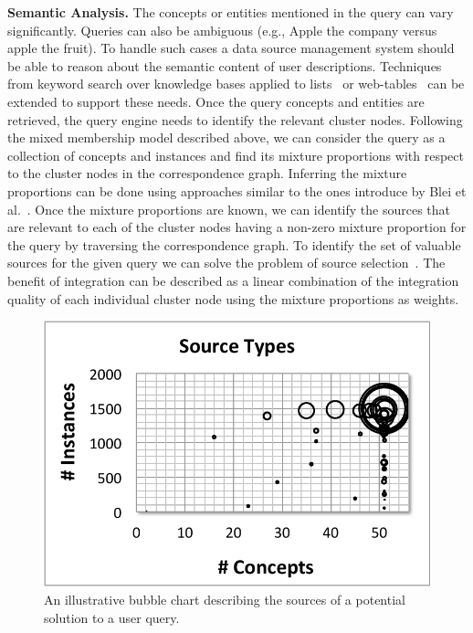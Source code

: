 \documentclass{sig-alternate}
\begin{document}
\vspace{3pt}\noindent\textbf{Semantic Analysis.} The concepts or entities mentioned in the query can vary significantly. Queries can also be ambiguous (e.g., Apple the company versus apple the fruit). To handle such cases a data source management system should be able to reason about the semantic content of user descriptions. Techniques from keyword search over knowledge bases applied to lists~\cite{pimplikar:2012} or web-tables~\cite{dassarma:2012} can be extended to support these needs. Once the query concepts and entities are retrieved, the query engine needs to identify the relevant cluster nodes. Following the mixed membership model described above, we can consider the query as a collection of concepts and instances and find its mixture proportions with respect to the cluster nodes in the correspondence graph. Inferring the mixture proportions can be done using approaches similar to the ones introduce by Blei et al.~\cite{blei:2003}. Once the mixture proportions are known, we can identify the sources that are relevant to each of the cluster nodes having a non-zero mixture proportion for the query by traversing the correspondence graph. To identify the set of valuable sources for the given query we can solve the problem of source selection~\cite{dong:vldb13, rekatsinas:2014}. The benefit of integration can be described as a linear combination of the integration quality of each individual cluster node using the mixture proportions as weights.
\begin{figure}
	\begin{center}
	\includegraphics[clip,scale=0.36]{fig/sources.pdf}
	\vspace{-5pt}
	\caption{An illustrative bubble chart describing the sources of a potential solution to a user query.}
	\label{fig:bubble}
	\end{center}
	\vspace{-25pt}
\end{figure}
\end{document}
